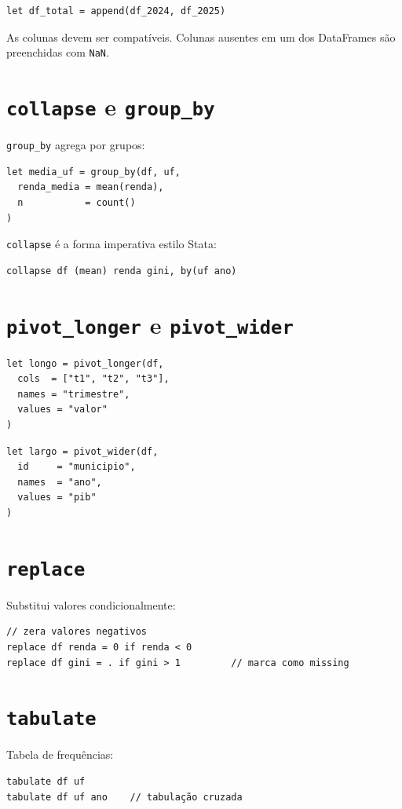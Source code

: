 \begin{lstlisting}
let df_total = append(df_2024, df_2025)
\end{lstlisting}

As colunas devem ser compatíveis. Colunas ausentes em um dos DataFrames são
preenchidas com \texttt{NaN}.

\section{\texttt{collapse} e \texttt{group\_by}}

\lstinline{group_by} agrega por grupos:

\begin{lstlisting}[caption={Agregação por grupo}]
let media_uf = group_by(df, uf,
  renda_media = mean(renda),
  n           = count()
)
\end{lstlisting}

\lstinline{collapse} é a forma imperativa estilo Stata:

\begin{lstlisting}
collapse df (mean) renda gini, by(uf ano)
\end{lstlisting}

\section{\texttt{pivot\_longer} e \texttt{pivot\_wider}}

\begin{lstlisting}[caption={Formato largo para longo}]
let longo = pivot_longer(df,
  cols  = ["t1", "t2", "t3"],
  names = "trimestre",
  values = "valor"
)
\end{lstlisting}

\begin{lstlisting}[caption={Formato longo para largo}]
let largo = pivot_wider(df,
  id     = "municipio",
  names  = "ano",
  values = "pib"
)
\end{lstlisting}

\section{\texttt{replace}}

Substitui valores condicionalmente:

\begin{lstlisting}
// zera valores negativos
replace df renda = 0 if renda < 0
replace df gini = . if gini > 1         // marca como missing
\end{lstlisting}

\section{\texttt{tabulate}}

Tabela de frequências:

\begin{lstlisting}
tabulate df uf
tabulate df uf ano    // tabulação cruzada
\end{lstlisting}
